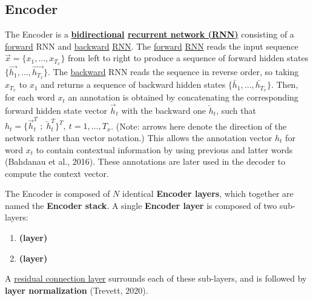 \subsection{Encoder} \label{sec:TransformerEncoder}

The Encoder is a \textbf{\hyperref[sec:BidirectionalLM]{bidirectional} \hyperref[sec:RNN]{recurrent network (RNN)}} consisting of a \hyperref[sec:ForwardLM]{forward} RNN and \hyperref[sec:BackwardLM]{backward} \hyperref[sec:RNN]{RNN}. The \hyperref[sec:ForwardLM]{forward} \hyperref[sec:RNN]{RNN} reads the input sequence $\overrightarrow{x} = \Big\{ x_1,...,x_{T_x} \Big\}$ from left to right to produce a sequence of forward hidden states $\Big\{ \overrightarrow{h_1},..., \overrightarrow{h_{T_x}} \Big\}$. The \hyperref[sec:BackwardLM]{backward} RNN reads the sequence in reverse order, so taking $x_{T_x}$ to $x_1$ and returns a sequence of backward hidden states $\Big\{ \overleftarrow{h_1},..., \overleftarrow{h_{T_x}} \Big\}$. Then, for each word $x_t$ an annotation is obtained by concatenating the corresponding forward hidden state vector $\overrightarrow{h}_t$ with the backward one $\overleftarrow{h}_t$, such that $h_t = \Big \{ \overrightarrow{h}_t^T \; ; \; \overleftarrow{h}_t^T \Big\}^T , \: t=1,...,T_x$. (Note: arrows here denote the direction of the network rather than vector notation.) This allows the annotation vector $h_t$ for word $x_t$ to contain contextual information by using previous and latter words (Bahdanau et al., 2016). These annotations are later used in the decoder to compute the context vector.  

The Encoder is composed of $N$ identical \textbf{Encoder layers}, which together are named the \textbf{Encoder stack}. A single \textbf{Encoder layer}  is composed of two sub-layers: 
\begin{enumerate}
    \item \textbf{  (layer)}
    
    \item \textbf{  (layer)}
\end{enumerate}

A \hyperref[sec:ResidualConnections]{residual connection layer} surrounds each of these sub-layers, and is followed by \textbf{layer normalization} (Trevett, 2020).  




